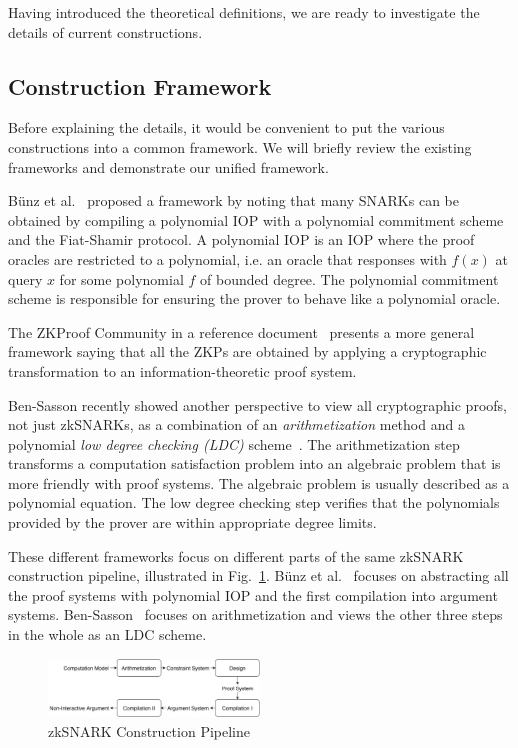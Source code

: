 \documentclass[acmtog]{acmart}
\begin{document}
Having introduced the theoretical definitions, we are ready to investigate the details of current constructions.

\subsection{Construction Framework}
\label{sec:framework}

Before explaining the details, it would be convenient to put the various constructions into a common framework.
We will briefly review the existing frameworks and demonstrate our unified framework.

B\"{u}nz et al.~\cite{BunzFS20} proposed a framework by noting that many SNARKs can be obtained by compiling a polynomial IOP with a polynomial commitment scheme and the Fiat-Shamir protocol.
A polynomial IOP is an IOP where the proof oracles are restricted to a polynomial, i.e. an oracle that responses with $f(x)$ at query $x$ for some polynomial $f$ of bounded degree.
The polynomial commitment scheme is responsible for ensuring the prover to behave like a polynomial oracle.

The ZKProof Community in a reference document~\cite{ZKProof20} presents a more general framework saying that all the ZKPs are obtained by applying a cryptographic transformation to an information-theoretic proof system.

Ben-Sasson recently showed another perspective to view all cryptographic proofs, not just zkSNARKs, as a combination of an \emph{arithmetization} method and a polynomial \emph{low degree checking (LDC)} scheme~\cite{Ben-Sasson2020}.
The arithmetization step transforms a computation satisfaction problem into an algebraic problem that is more friendly with proof systems.
The algebraic problem is usually described as a polynomial equation.
The low degree checking step verifies that the polynomials provided by the prover are within appropriate degree limits.

These different frameworks focus on different parts of the same zkSNARK construction pipeline, illustrated in Fig.~\ref{fig:pipeline}.
B\"{u}nz et al.~\cite{BunzFS20} focuses on abstracting all the proof systems with polynomial IOP and the first compilation into argument systems.
Ben-Sasson~\cite{Ben-Sasson2020} focuses on arithmetization and views the other three steps in the whole as an LDC scheme.

\begin{figure}[ht!]
\includegraphics[width=0.5\textwidth]{images/pipeline.pdf}
\caption{zkSNARK Construction Pipeline}
\label{fig:pipeline}
\Description{}
\end{figure}
\end{document}
